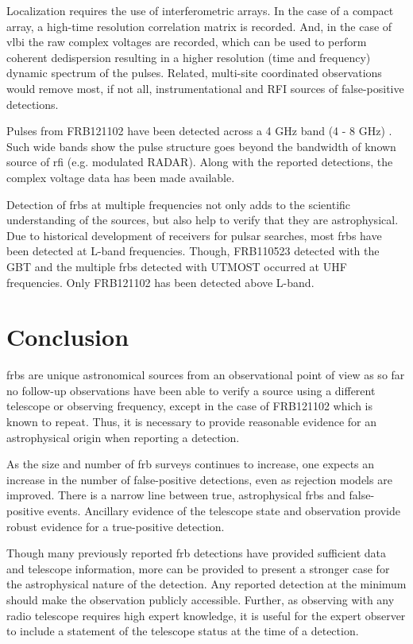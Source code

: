 \documentclass[a4paper,fleqn,usenatbib]{mnras}
\begin{document}
Localization requires the use of interferometric arrays. In the case of a
compact array, a high-time resolution correlation matrix is recorded. And, in
the case of \gls{vlbi} the raw complex voltages are recorded, which can be used
to perform coherent dedispersion resulting in a higher resolution (time and
frequency) dynamic spectrum of the pulses.  Related, multi-site coordinated
observations would remove most, if not all, instrumentational and RFI sources of
false-positive detections.

Pulses from FRB121102 have been detected across a 4 GHz band (4 - 8 GHz)
\citep{atel10675}. Such wide bands show the pulse structure goes beyond the
bandwidth of known source of \gls{rfi} (e.g. modulated RADAR).
Along with the reported detections, the complex voltage data
has been made available.

Detection of \glspl{frb} at multiple frequencies not only adds to the scientific
understanding of the sources, but also help to verify that they are
astrophysical.  Due to historical development of receivers for pulsar searches,
most \glspl{frb} have been detected at L-band frequencies. Though, FRB110523
detected with the GBT and the multiple \glspl{frb} detected with UTMOST occurred
at UHF frequencies.  Only FRB121102 has been detected above L-band.

\section{Conclusion}

\glspl{frb} are unique astronomical sources from an observational point of view
as so far no follow-up observations have been able to verify a source using a
different telescope or observing frequency, except in the case of FRB121102
which is known to repeat. Thus, it is necessary to provide reasonable evidence
for an astrophysical origin when reporting a detection. 

As the size and number of \gls{frb} surveys continues to increase, one expects
an increase in the number of false-positive detections, even as rejection models
are improved. There is a narrow line between true, astrophysical \glspl{frb} and
false-positive events. Ancillary evidence of the telescope state and observation
provide robust evidence for a true-positive detection. 

Though many previously reported \gls{frb} detections have provided sufficient
data and telescope information, more can be provided to present a stronger case
for the astrophysical nature of the detection. Any reported detection at the
minimum should make the observation publicly accessible. Further, as
observing with any radio telescope requires high expert knowledge, it is useful
for the expert observer to include a statement of the telescope status at the
time of a detection.
\end{document}
